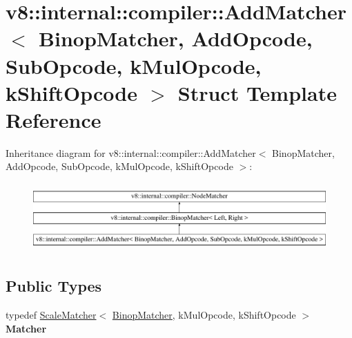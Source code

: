 \hypertarget{structv8_1_1internal_1_1compiler_1_1AddMatcher}{}\section{v8\+:\+:internal\+:\+:compiler\+:\+:Add\+Matcher$<$ Binop\+Matcher, Add\+Opcode, Sub\+Opcode, k\+Mul\+Opcode, k\+Shift\+Opcode $>$ Struct Template Reference}
\label{structv8_1_1internal_1_1compiler_1_1AddMatcher}
Inheritance diagram for v8\+:\+:internal\+:\+:compiler\+:\+:Add\+Matcher$<$ Binop\+Matcher, Add\+Opcode, Sub\+Opcode, k\+Mul\+Opcode, k\+Shift\+Opcode $>$\+:\begin{figure}[H]
\begin{center}
\leavevmode
\includegraphics[height=2.649842cm]{structv8_1_1internal_1_1compiler_1_1AddMatcher}
\end{center}
\end{figure}
\subsection*{Public Types}
\begin{DoxyCompactItemize}
\item 
\mbox{\label{structv8_1_1internal_1_1compiler_1_1AddMatcher_a56dd5d7b87962d28d0b499d0cf7d63e6}} 
typedef \mbox{\hyperlink{structv8_1_1internal_1_1compiler_1_1ScaleMatcher}{Scale\+Matcher}}$<$ \mbox{\hyperlink{structv8_1_1internal_1_1compiler_1_1BinopMatcher}{Binop\+Matcher}}, k\+Mul\+Opcode, k\+Shift\+Opcode $>$ {\bfseries Matcher}
\end{DoxyCompactItemize}
